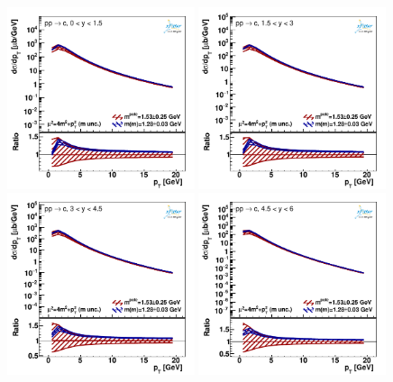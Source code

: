 \documentclass[12pt,a4paper]{article}
\begin{document}
\begin{figure}
    \centering
    \includegraphics[width=0.49\textwidth]{figs/parton-ptmax20/dyn-therr-mass/data_401-1.pdf}
    \includegraphics[width=0.49\textwidth]{figs/parton-ptmax20/dyn-therr-mass/data_401-2.pdf}
    \includegraphics[width=0.49\textwidth]{figs/parton-ptmax20/dyn-therr-mass/data_401-3.pdf}
    \includegraphics[width=0.49\textwidth]{figs/parton-ptmax20/dyn-therr-mass/data_401-4.pdf}

\end{figure}
\end{document}
